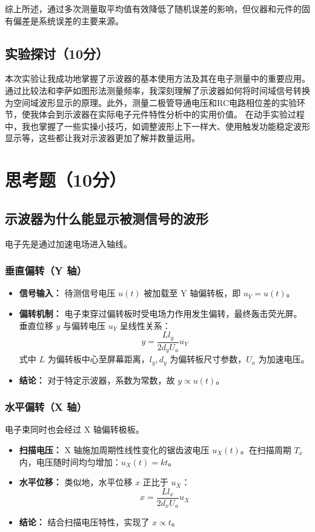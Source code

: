 \documentclass[]{../../templates/Report}%
\begin{document}
综上所述，通过多次测量取平均值有效降低了随机误差的影响，但仪器和元件的固有偏差是系统误差的主要来源。

\subsection{实验探讨（10分）}

本次实验让我成功地掌握了示波器的基本使用方法及其在电子测量中的重要应用。通过比较法和李萨如图形法测量频率，我深刻理解了示波器如何将时间域信号转换为空间域波形显示的原理。此外，测量二极管导通电压和RC电路相位差的实验环节，使我体会到示波器在实际电子元件特性分析中的实用价值。
在动手实验过程中，我也掌握了一些实操小技巧，如调整波形上下一样大、使用触发功能稳定波形显示等，这些都让我对示波器更加了解并数量运用。
\section{思考题（10分）}

\subsection{示波器为什么能显示被测信号的波形}
电子先是通过加速电场进入轴线。
\subsubsection{垂直偏转（Y 轴）}
\begin{itemize}
    \item \textbf{信号输入：} 待测信号电压 $u(t)$ 被加载至 Y 轴偏转板，即 $u_Y = u(t)$。
    \item \textbf{偏转机制：} 电子束穿过偏转板时受电场力作用发生偏转，最终轰击荧光屏。垂直位移 $y$ 与偏转电压 $u_Y$ 呈线性关系：
    \[ y = \frac{L l_y}{2 d_y U_a} u_Y \]
    式中 $L$ 为偏转板中心至屏幕距离，$l_y, d_y$ 为偏转板尺寸参数，$U_a$ 为加速电压。
    \item \textbf{结论：} 对于特定示波器，系数为常数，故 $y \propto u(t)$。
\end{itemize}

\subsubsection{水平偏转（X 轴）}

电子束同时也会经过 X 轴偏转极板。

\begin{itemize}
    \item \textbf{扫描电压：} X 轴施加周期性线性变化的锯齿波电压 $u_X(t)$。在扫描周期 $T_x$ 内，电压随时间均匀增加：$u_X(t) = k t$。
    \item \textbf{水平位移：} 类似地，水平位移 $x$ 正比于 $u_X$：
    \[ x = \frac{L l_x}{2 d_x U_a} u_X \]
    \item \textbf{结论：} 结合扫描电压特性，实现了 $x \propto t$。
\end{itemize}
\end{document}
